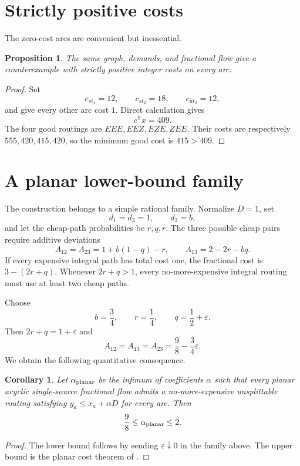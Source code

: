 \documentclass[11pt]{article}
\newtheorem{proposition}[theorem]{Proposition}
\newtheorem{corollary}[theorem]{Corollary}
\theoremstyle{definition}
\newcommand{\1}{\mathbf{1}}
\begin{document}
\section{Strictly positive costs}

The zero-cost arcs are convenient but inessential.

\begin{proposition}\label{prop:positive}
The same graph, demands, and fractional flow give a counterexample with
strictly positive integer costs on every arc.
\end{proposition}

\begin{proof}
Set
\[
 c_{st_1}=12,\qquad c_{st_2}=18,\qquad c_{ut_3}=12,
\]
and give every other arc cost $1$.  Direct calculation gives
\[
 c^\mathsf{T}x=409.
\]
The four good routings are $EEE,EEZ,EZE,ZEE$.  Their costs are respectively
$555,420,415,420$, so the minimum good cost is $415>409$.
\end{proof}

\section{A planar lower-bound family}

The construction belongs to a simple rational family.  Normalize $D=1$,
set
\[
 d_1=d_3=1,\qquad d_2=b,
\]
and let the cheap-path probabilities be $r,q,r$.  The three possible cheap
pairs require additive deviations
\[
 A_{12}=A_{23}=1+b(1-q)-r,
 \qquad
 A_{13}=2-2r-bq.
\]
If every expensive integral path has total cost one, the fractional cost is
$3-(2r+q)$.  Whenever $2r+q>1$, every no-more-expensive integral routing must
use at least two cheap paths.

Choose
\[
 b=\frac34,\qquad r=\frac14,\qquad q=\frac12+\varepsilon.
\]
Then $2r+q=1+\varepsilon$ and
\[
 A_{12}=A_{13}=A_{23}
 =\frac98-\frac34\varepsilon.
\]
We obtain the following quantitative consequence.

\begin{corollary}\label{cor:planar}
Let $\alpha_{\rm planar}$ be the infimum of coefficients $\alpha$ such that
every planar acyclic single-source fractional flow admits a no-more-expensive
unsplittable routing satisfying $y_a\le x_a+\alpha D$ for every arc.  Then
\[
 \frac98\le \alpha_{\rm planar}\le2.
\]
\end{corollary}

\begin{proof}
The lower bound follows by sending $\varepsilon\downarrow0$ in the family
above.  The upper bound is the planar cost theorem of
\citet{TraubVargasKochZenklusen2024}.
\end{proof}
\end{document}
